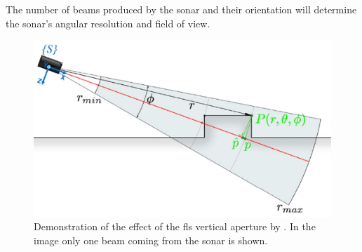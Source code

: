 The number of beams produced by the sonar and their orientation will determine the sonar's angular resolution and field of view.

\begin{figure}[H] 
  \centering
  \includegraphics[width=.7\textwidth]{figures/FLS.png}
  \caption[\acrshort{fls} vertical aperture]{Demonstration of the effect of the \acrshort{fls} vertical aperture by \citeauthor{Hurtos2015} \cite{Hurtos2015}. In the image only one beam coming from the sonar is shown.}
\end{figure}

